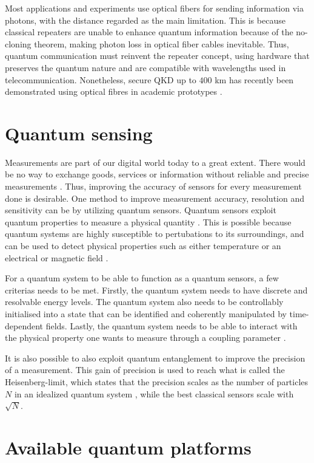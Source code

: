 Most applications and experiments use optical fibers for sending information via photons, with the distance regarded as the main limitation. This is because classical repeaters are unable to enhance quantum information because of the no-cloning theorem, making photon loss in optical fiber cables inevitable. Thus, quantum communication must reinvent the repeater concept, using hardware that preserves the quantum nature \cite{Acin2018} and are compatible with wavelengths used in telecommunication. Nonetheless, secure QKD up to $400$ km has recently been demonstrated using optical fibres in academic prototypes \cite{Boaron2018}.

\section{Quantum sensing}

Measurements are part of our digital world today to a great extent. There would be no way to exchange goods, services or information without reliable and precise measurements \cite{Acin2018}. Thus, improving the accuracy of sensors for every measurement done is desirable. One method to improve measurement accuracy, resolution and sensitivity can be by utilizing quantum sensors. Quantum sensors exploit quantum properties to measure a physical quantity \cite{Degen2017}. This is possible because quantum systems are highly susceptible to pertubations to its surroundings, and can be used to detect physical properties such as either temperature or an electrical or magnetic field \cite{Degen2017}.

For a quantum system to be able to function as a quantum sensors, a few criterias needs to be met.  Firstly, the quantum system needs to have discrete and resolvable energy levels. The quantum system also needs to be controllably initialised into a state that can be identified and coherently manipulated by time-dependent fields. Lastly, the quantum system needs to be able to interact with the physical property one wants to measure through a coupling parameter \cite{Degen2017}.

It is also possible to also exploit quantum entanglement to improve the precision of a measurement. This gain of precision is used to reach what is called the Heisenberg-limit, which states that the precision scales as the number of particles $N$ in an idealized quantum system \cite{Degen2017, Acin2018}, while the best classical sensors scale with $\sqrt{N}$.

\section{Available quantum platforms}

